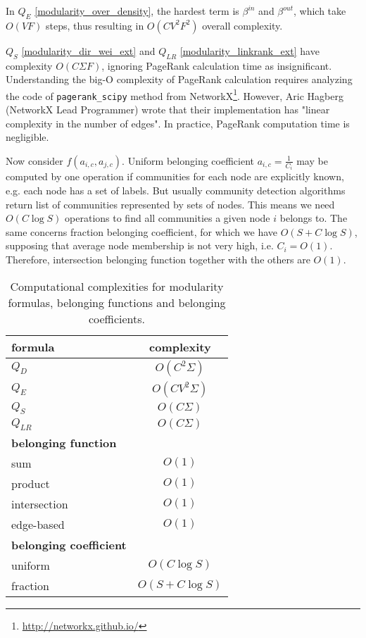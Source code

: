 \documentclass[a4paper,twocolumn]{article}
\begin{document}
In $Q_E$ \eqref{modularity_over_density}, the hardest term is $\beta^{in}$ and $\beta^{out}$, which take $O(VF)$ steps, thus resulting in $O(C V^2 F^2)$ overall complexity.

$Q_S$ \eqref{modularity_dir_wei_ext} and $Q_{LR}$ \eqref{modularity_linkrank_ext} have complexity $O(C \Sigma F)$, ignoring PageRank calculation time as insignificant. Understanding the big-O complexity of PageRank calculation requires analyzing the code of \texttt{pagerank\_scipy} method from NetworkX\footnote{\url{http://networkx.github.io/}}. However, Aric Hagberg (NetworkX Lead Programmer) wrote that their implementation has "linear complexity in the number of edges". In practice, PageRank computation time is negligible.

Now consider $f(a_{i,c},a_{j,c})$. Uniform belonging coefficient $a_{i,c}=\frac{1}{C_i}$ may be computed by one operation if communities for each node are explicitly known, e.g. each node has a set of labels. But usually community detection algorithms return list of communities represented by sets of nodes. This means we need $O(C \log{S})$ operations to find all communities a given node $i$ belongs to. The same concerns fraction belonging coefficient, for which we have $O(S+C \log{S})$, supposing that average node membership is not very high, i.e. $C_i = O(1)$. Therefore, intersection belonging function together with the others are $O(1)$.

\begin{table}[h!]
\centering
\caption{\label{table_compl}Computational complexities for modularity formulas, belonging functions and belonging coefficients.}
\begin{tabular}{lc}
\textbf{formula} & \textbf{complexity} \\
\hline
$Q_D$ & $O(C^2 \Sigma)$ \\
$Q_E$ & $O(C V^2 \Sigma)$ \\
$Q_S$ & $O(C \Sigma)$ \\
$Q_{LR}$ & $O(C \Sigma)$ \\
\hline
\textbf{belonging function} \\
\hline
sum & $O(1)$ \\
product & $O(1)$ \\
intersection & $O(1)$ \\
edge-based & $O(1)$ \\
\hline
\textbf{belonging coefficient} \\
\hline
uniform & $O(C \log{S})$ \\
fraction & $O(S+C \log{S})$ \\
\end{tabular}
\end{table}
\end{document}
